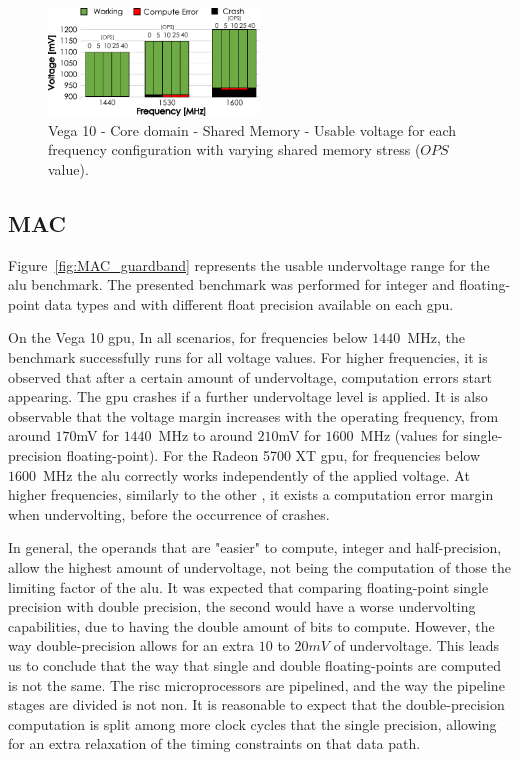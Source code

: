 \begin{figure}[htb]
  \centering
  \includegraphics[width=0.5\textwidth]{Figures/GPU_characterization/SharedMemory_guardband.pdf}
  \caption{Vega 10 - Core domain - Shared Memory - Usable voltage for each frequency configuration with varying shared memory stress ($OPS$ value).}
  \label{fig:SharedMemory_guardband}
\end{figure}

\subsection{MAC}

\label{sec:cmac_guardband}

Figure~\ref{fig:MAC_guardband} represents the usable undervoltage range for the \acrshort{alu} benchmark. The presented benchmark was performed for integer and floating-point data types and with different float precision available on each \acrshort{gpu}. 

On the Vega 10 \acrshort{gpu}, In all scenarios, for frequencies below $1440$~MHz, the benchmark successfully runs for all voltage values. For higher frequencies, it is observed that after a certain amount of undervoltage, computation errors start appearing. The \acrshort{gpu} crashes if a further undervoltage level is applied. 
It is also observable that the voltage margin increases with the operating frequency, from around $170$mV for $1440$~MHz to around $210$mV for $1600$~MHz (values for single-precision floating-point). For the Radeon 5700 XT \acrshort{gpu}, for frequencies below $1600$~MHz the \acrshort{alu} correctly works independently of the applied voltage. At higher frequencies, similarly to the other , it exists a computation error margin when undervolting, before the occurrence of crashes.

In general, the operands that are "easier" to compute, integer and half-precision, allow the highest amount of undervoltage, not being the computation of those the limiting factor of the \acrshort{alu}. 
It was expected that comparing floating-point single precision with double precision, the second would have a worse undervolting capabilities, due to having the double amount of bits to compute. However, the way double-precision allows for an extra $10$ to $20mV$ of undervoltage. This leads us to conclude that the way that single and double floating-points are computed is not the same. The \acrshort{risc} microprocessors are pipelined, and the way the pipeline stages are divided is not non. It is reasonable to expect that the double-precision computation is split among more clock cycles that the single precision, allowing for an extra relaxation of the timing constraints on that data path.

